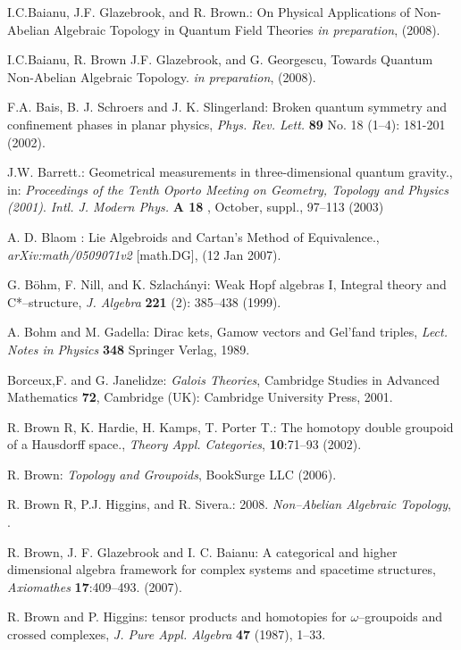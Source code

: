\documentclass[12pt]{article}
\theoremstyle{plain}
\theoremstyle{definition}
\numberwithin{equation}{section}
\newcommand{\<}{{\langle}}
\begin{document}
\begin{thebibliography}{99}
I.C.Baianu, J.F. Glazebrook, and R. Brown.: On Physical Applications of Non-Abelian Algebraic Topology in Quantum Field Theories \emph{in preparation}, (2008).

I.C.Baianu, R. Brown J.F. Glazebrook, and G. Georgescu, Towards Quantum Non-Abelian Algebraic Topology. \textit{in preparation}, (2008).

F.A. Bais, B. J. Schroers and J. K. Slingerland: Broken quantum symmetry and confinement phases in planar physics, \emph{Phys. Rev. Lett.} \textbf{89} No. 18 (1--4): 181-201 (2002).

J.W. Barrett.: Geometrical measurements in three-dimensional quantum gravity., in:
{\em Proceedings of the Tenth Oporto Meeting on Geometry, Topology and Physics (2001)}.
\textit{Intl. J. Modern Phys.} \textbf{A 18} , October, suppl., 97--113 (2003)

A. D. Blaom : Lie Algebroids and Cartan's Method of Equivalence., {\em arXiv:math/0509071v2} [math.DG], (12 Jan 2007).

G. B\"ohm, F. Nill, and K. Szlach\'anyi: Weak Hopf algebras I, Integral theory and C*--structure, \emph{J. Algebra} \textbf{221} (2): 385--438 (1999).

A. Bohm and M. Gadella: Dirac kets, Gamow vectors and Gel'fand triples, \emph{Lect. Notes in Physics} \textbf{348} Springer Verlag, 1989.

Borceux,F. and G. Janelidze: \emph{Galois Theories}, Cambridge Studies in Advanced Mathematics \textbf{72}, Cambridge (UK): Cambridge University Press, 2001.

R. Brown R, K. Hardie, H. Kamps, T. Porter T.: The homotopy double groupoid of a Hausdorff space., 
\emph{Theory Appl. Categories}, \textbf{10}:71--93 (2002).

R. Brown: \emph{Topology and Groupoids}, BookSurge LLC (2006).

R. Brown R, P.J. Higgins, and R. Sivera.: 2008. \textit{Non--Abelian Algebraic Topology}, 
.

R. Brown, J. F. Glazebrook and I. C. Baianu: A categorical and higher dimensional algebra framework for complex systems and spacetime structures, \emph{Axiomathes} \textbf{17}:409--493.
(2007).

R. Brown and P. Higgins: tensor products and homotopies for $\omega$--groupoids and crossed complexes, \emph{J. Pure Appl. Algebra} \textbf{47} (1987), 1--33.


\end{thebibliography}
\end{document}
